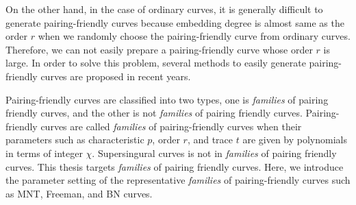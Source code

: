 On the other hand, in the case of ordinary curves, it is generally difficult to generate pairing-friendly curves because embedding degree is almost same as the order $r$ when we randomly choose the pairing-friendly curve from ordinary curves.
Therefore, we can not easily prepare a pairing-friendly curve whose order $r$ is large.
In order to solve this problem, several methods to easily generate pairing-friendly curves are proposed in recent years\cite{Taxo}.

Pairing-friendly curves are classified into two types, one is {\it families} of pairing friendly curves, and the other is not {\it families} of pairing friendly curves.
Pairing-friendly curves are called {\it families} of pairing-friendly curves when their parameters such as characteristic $p$, order $r$, and trace $t$ are given by polynomials in terms of integer $\chi$.
Supersingural curves is not in {\it families} of pairing friendly curves.
This thesis targets {\it families} of pairing friendly curves.
Here, we introduce the parameter setting of the representative {\it families} of pairing-friendly curves such as MNT\cite{MNT}, Freeman\cite{FreemanPDF}, and BN curves\cite{BN}.



